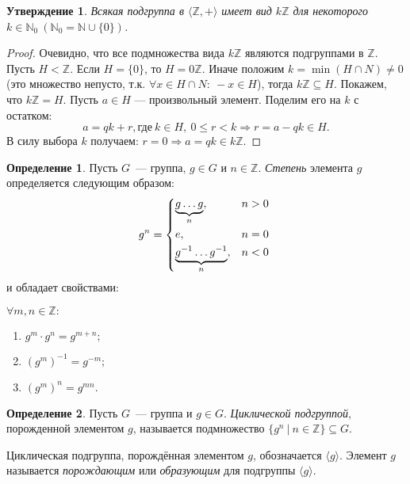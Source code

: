 \documentclass[a4paper, 14pt]{extarticle}
\newcommand{\n}{\par}
\newcommand{\integers}{\mathbb{Z}}
\newcommand{\naturals}{\mathbb{N}}
\theoremstyle{definition}
\newtheorem{definition}{Определение}
\theoremstyle{plain}
\numberwithin{theorem}{section}
\numberwithin{definition}{section}
\newtheorem*{statement*}{Утверждение}
\numberwithin{statement}{section}
\numberwithin{lemma}{section}
\numberwithin{consequence}{section}
\begin{document}
	\begin{statement*}
		Всякая подгруппа в ${}\langle\integers, +\rangle$ имеет вид $k\integers$ для некоторого ${k \in \naturals_0 \ (\mathbb{N}_0 = \mathbb{N} \cup \{0\})}$.
	\end{statement*}
	\begin{proof}
		Очевидно, что все подмножества вида $k\mathbb{Z}$ являются подгруппами в $\integers$.
		Пусть ${H < \integers}$. Если ${H = \{0\}}$, то ${H = 0\integers}$.
		Иначе положим ${k = \min(H \cap N) \neq 0}$ (это множество непусто, т.к. ${\forall x \in H \cap N{:} ~-x \in H}$), тогда ${k\integers \subseteq H}$.
		Покажем, что ${k\integers = H}$. Пусть ${a \in H}$ — произвольный элемент. Поделим его на $k$ с остатком:
		\begin{equation*}
			a = qk + r, \text{где} \ k \in H, \  
			0 \leqslant r < k \Rightarrow r = a - qk \in H.
		\end{equation*}
		В силу выбора $k$ получаем: ${r = 0 \Rightarrow a = qk \in k\integers}$.
	\end{proof}
	\begin{definition}
		Пусть $G$~--- группа, $g \in G$ и $n \in \integers$. \textit{Степень} элемента $g$ определяется следующим образом:
		\begin{equation*}
			g^{n}=
			\begin{cases*}
				\underbrace{g \mathellipsis g}_n,  &$n > 0$ \\
				e,  &$n = 0$ \\
				\underbrace{g^{-1} \mathellipsis g^{-1}}_n, &$n < 0$
			\end{cases*}
		\end{equation*}
		и обладает свойствами:\n
		$\forall m, n \in \integers:$
		\begin{enumerate}
			\setlength\itemsep{0.1em}
			\item $g^m \cdot g^n = g^{m+n};$
			\item $(g^m)^{-1} = g^{-m};$
			\item $(g^m)^n = g^{mn}.$
		\end{enumerate}
	\end{definition}
	\newpage
	\begin{definition}
		Пусть $G$~--- группа и $g \in G$. \textit{Циклической подгруппой}, порожденной элементом $g$, называется подмножество ${\{g^n \ | \ n \in \integers\} \subseteq G}$. \n
		Циклическая подгруппа, порождённая элементом $g$, обозначается $\langle g \rangle$. Элемент $g$ называется \textit{порождающим} или \textit{образующим} для подгруппы $\langle g \rangle$.
	\end{definition}
\end{document}

